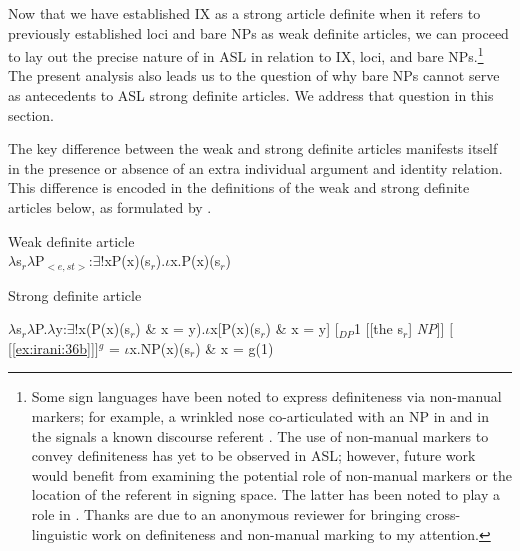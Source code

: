 \documentclass[output=paper,
modfonts
]{langscibook}
\begin{document}
Now that we have established IX as a strong article definite when it refers to previously established loci and bare NPs as weak definite articles, we can proceed to lay out the precise nature of  in ASL in relation to IX, loci, and bare NPs.\footnote{Some sign languages have been noted to express definiteness via non-manual markers; for example, a wrinkled nose co-articulated with an NP in  and in the  signals a known discourse referent \citep{Kimmelman2015}. The use of non-manual markers to convey definiteness has yet to be observed in ASL; however, future work would benefit from examining the potential role of non-manual markers or the location of the referent in signing space. The latter has been noted to play a role in  \citep{Barbera2014}. Thanks are due to an anonymous reviewer for bringing cross-linguistic work on definiteness and non-manual marking to my attention.} The present analysis also leads us to the question of why bare NPs cannot serve as antecedents to ASL strong definite articles. We address that question in this section. 

The key difference between the weak and strong definite articles manifests itself in the presence or absence of an extra individual argument and identity relation. This difference is encoded in the definitions of the weak and strong definite articles below, as formulated by \citet{Schwarz2009}.

\begin{exe} 
\ex Weak definite article\\ 
\(\lambda\)s$_r$\(\lambda\)P$_{<e,st>}$:\(\exists\)!xP(x)(s$_r$).\(\iota\)x.P(x)(s$_r$) \citep[148]{Schwarz2009}
\end{exe} 

\begin{exe}
\ex Strong definite article 

\begin{xlist}
	\ex \(\lambda\)s$_r$\(\lambda\)P.\(\lambda\)y:\(\exists\)!x(P(x)(s$_r$) \& x = y).\(\iota\)x[P(x)(s$_r$) \& x = y]
	\ex \label{ex:irani:36b} {[}$_{DP}$1 [[the s$_r$] \emph{NP}]{]}
	\ex ${[}$[\ref{ex:irani:36b}]${]}$$^{g}$ = \(\iota\)x.NP(x)(s$_r$) \& x = g(1) \citep[260]{Schwarz2009}
\end{xlist}

\end{exe}
\end{document}
